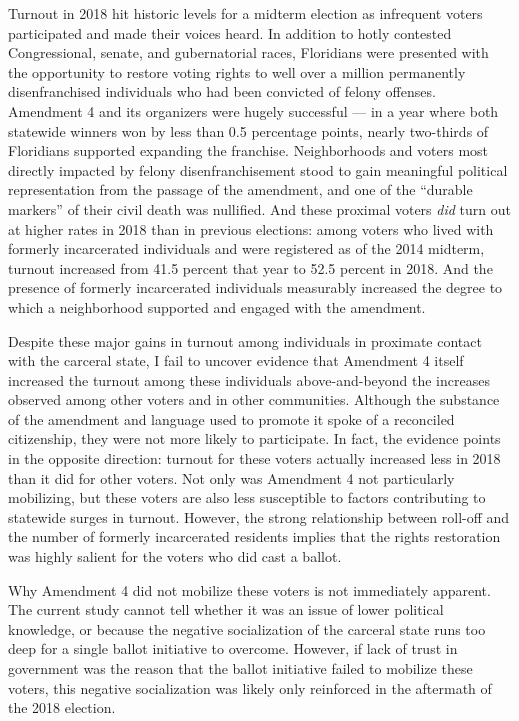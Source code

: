 \documentclass[
  12pt,
]{article}
\begin{document}
Turnout in 2018 hit historic levels for a midterm election as infrequent voters participated and made their voices heard. In addition to hotly contested Congressional, senate, and gubernatorial races, Floridians were presented with the opportunity to restore voting rights to well over a million permanently disenfranchised individuals who had been convicted of felony offenses. Amendment 4 and its organizers were hugely successful --- in a year where both statewide winners won by less than 0.5 percentage points, nearly two-thirds of Floridians supported expanding the franchise. Neighborhoods and voters most directly impacted by felony disenfranchisement stood to gain meaningful political representation from the passage of the amendment, and one of the ``durable markers'' of their civil death was nullified. And these proximal voters \emph{did} turn out at higher rates in 2018 than in previous elections: among voters who lived with formerly incarcerated individuals and were registered as of the 2014 midterm, turnout increased from 41.5 percent that year to 52.5 percent in 2018. And the presence of formerly incarcerated individuals measurably increased the degree to which a neighborhood supported and engaged with the amendment.

Despite these major gains in turnout among individuals in proximate contact with the carceral state, I fail to uncover evidence that Amendment 4 itself increased the turnout among these individuals above-and-beyond the increases observed among other voters and in other communities. Although the substance of the amendment and language used to promote it spoke of a reconciled citizenship, they were not more likely to participate. In fact, the evidence points in the opposite direction: turnout for these voters actually increased less in 2018 than it did for other voters. Not only was Amendment 4 not particularly mobilizing, but these voters are also less susceptible to factors contributing to statewide surges in turnout. However, the strong relationship between roll-off and the number of formerly incarcerated residents implies that the rights restoration was highly salient for the voters who did cast a ballot.

Why Amendment 4 did not mobilize these voters is not immediately apparent. The current study cannot tell whether it was an issue of lower political knowledge, or because the negative socialization of the carceral state runs too deep for a single ballot initiative to overcome. However, if lack of trust in government was the reason that the ballot initiative failed to mobilize these voters, this negative socialization was likely only reinforced in the aftermath of the 2018 election.
\end{document}
